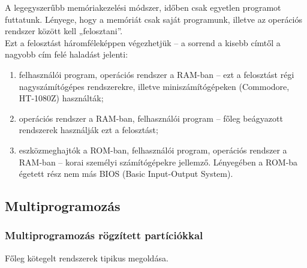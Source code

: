 \documentclass[tikz,12pt,margin=0px]{article}
\begin{document}
    \noindent A legegyszerűbb memóriakezelési módszer, időben csak egyetlen programot futtatunk. Lényege, hogy a memóriát csak saját programunk, illetve az operációs rendszer között kell „felosztani”. \\

    \noindent Ezt a felosztást háromféleképpen végezhetjük – a sorrend a kisebb címtől a nagyobb cím felé haladást jelenti:  \\
    \begin{enumerate}[topsep=8pt,itemsep=4pt,partopsep=4pt, parsep=4pt]
        \item felhasználói program, operációs rendszer a RAM-ban – ezt a felosztást régi nagyszámítógépes rendszerekre, illetve miniszámítógépeken (Commodore, HT-1080Z) használták;
        \item operációs rendszer a RAM-ban, felhasználói program – főleg beágyazott rendszerek használják ezt a felosztást;
        \item eszközmeghajtók a ROM-ban, felhasználói program, operációs rendszer a RAM-ban – korai személyi számítógépekre jellemző. Lényegében a ROM-ba égetett rész nem más BIOS (Basic Input-Output System).
    \end{enumerate}

    \subsection*{Multiprogramozás\\}

    \subsubsection*{Multiprogramozás rögzített partíciókkal}

    \noindent Főleg kötegelt rendszerek tipikus megoldása.
\end{document}
